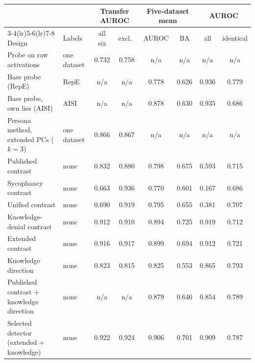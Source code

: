 \begin{tabular}{@{}l l cc cc cc@{}}
\toprule
& & \multicolumn{2}{c}{Transfer AUROC} & \multicolumn{2}{c}{Five-dataset mean} & \multicolumn{2}{c}{\hpkr{} AUROC} \\
\cmidrule(lr){3-4}\cmidrule(lr){5-6}\cmidrule(lr){7-8}
Design & Labels & all six & excl.\ \hpkr{} & AUROC & BA & all & identical \\
\midrule
Probe on raw activations & one dataset & 0.732 & 0.758 & n/a & n/a & n/a & n/a \\
Base probe (RepE) & RepE & n/a & n/a & 0.778 & 0.626 & 0.936 & 0.779 \\
Base probe, own lies (AISI) & AISI & n/a & n/a & 0.878 & 0.630 & 0.935 & 0.686 \\
Persona method, extended PCs ($k=3$) & one dataset & 0.866 & 0.867 & n/a & n/a & n/a & n/a \\
Published contrast & none & 0.832 & 0.880 & 0.798 & 0.675 & 0.593 & 0.715 \\
Sycophancy contrast & none & 0.663 & 0.936 & 0.770 & 0.601 & 0.167 & 0.686 \\
Unified contrast & none & 0.690 & 0.919 & 0.795 & 0.655 & 0.381 & 0.707 \\
Knowledge-denial contrast & none & 0.912 & 0.910 & 0.894 & 0.725 & 0.919 & 0.712 \\
Extended contrast & none & 0.916 & 0.917 & 0.899 & 0.694 & 0.912 & 0.721 \\
\midrule
Knowledge direction & none & 0.823 & 0.815 & 0.825 & 0.553 & 0.865 & 0.793 \\
Published contrast + knowledge direction & none & n/a & n/a & 0.879 & 0.646 & 0.854 & 0.789 \\
Selected detector (extended + knowledge) & none & 0.922 & 0.924 & 0.906 & 0.701 & 0.909 & 0.787 \\
\bottomrule
\end{tabular}
